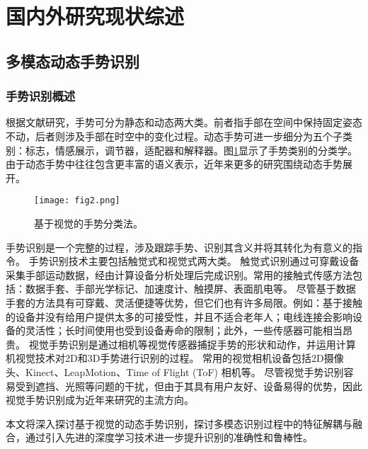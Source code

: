 \section{国内外研究现状综述}
\subsection{多模态动态手势识别}
\subsubsection{手势识别概述}
根据文献研究\cite{kaaniche2009gesture, rautaray2015vision}，手势可分为静态和动态两大类。前者指手部在空间中保持固定姿态不动，后者则涉及手部在时空中的变化过程。动态手势可进一步细分为五个子类别\cite{ottenheimer2018anthropology}：标志，情感展示，调节器，适配器和解释器。图\ref{fig:gesture_taxonomies}显示了手势类别的分类学。由于动态手势中往往包含更丰富的语义表示，近年来更多的研究围绕动态手势展开。
\begin{figure}
  \centering
  \texttt{[image: fig2.png]}
  \caption{基于视觉的手势分类法\cite{rautaray2015vision}。}
  \label{fig:gesture_taxonomies}
\end{figure}

手势识别是一个完整的过程，涉及跟踪手势、识别其含义并将其转化为有意义的指令\cite{rautaray2015vision}。
手势识别技术主要包括触觉式和视觉式两大类\cite{oudah2020hand,rautaray2015vision}。
触觉式识别通过可穿戴设备采集手部运动数据，经由计算设备分析处理后完成识别。常用的接触式传感方法包括：数据手套、手部光学标记、加速度计、触摸屏、表面肌电等\cite{oudah2020hand}。
尽管基于数据手套的方法具有可穿戴、灵活便捷等优势，但它们也有许多局限。例如：基于接触的设备并没有给用户提供太多的可接受性\cite{rautaray2015vision}，并且不适合老年人；电线连接会影响设备的灵活性；长时间使用也受到设备寿命的限制；此外，一些传感器可能相当昂贵\cite{oudah2020hand}。
视觉手势识别是通过相机等视觉传感器捕捉手势的形状和动作，并运用计算机视觉技术对2D和3D手势进行识别的过程。
常用的视觉相机设备包括2D摄像头、Kinect、LeapMotion、Time of Flight (ToF) 相机等\cite{基于视觉的动态手势识别研究综述}。
尽管视觉手势识别容易受到遮挡、光照等问题的干扰，但由于其具有用户友好、设备易得的优势，因此视觉手势识别成为近年来研究的主流方向。

本文将深入探讨基于视觉的动态手势识别，探讨多模态识别过程中的特征解耦与融合，通过引入先进的深度学习技术进一步提升识别的准确性和鲁棒性。

